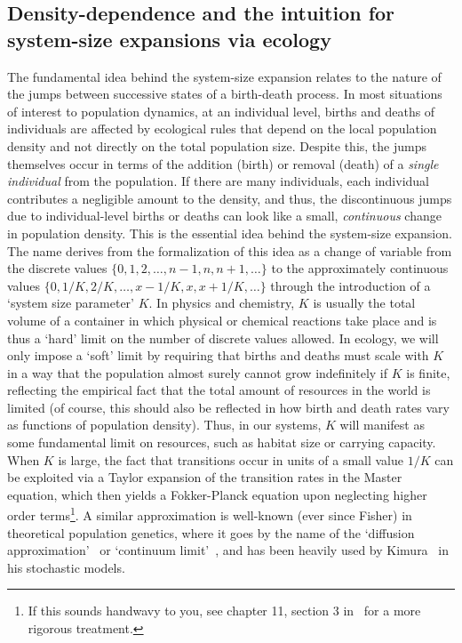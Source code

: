 \subsection{Density-dependence and the intuition for system-size expansions via ecology}\label{sec_intuition_sys_size}
The fundamental idea behind the system-size expansion relates to the nature of the jumps between successive states of a birth-death process. In most situations of interest to population dynamics, at an individual level, births and deaths of individuals are affected by ecological rules that depend on the local population density and not directly on the total population size. Despite this, the jumps themselves occur in terms of the addition (birth) or removal (death) of a \emph{single individual} from the population. If there are many individuals, each individual contributes a negligible amount to the density, and thus, the discontinuous jumps due to individual-level births or deaths can look like a small, \emph{continuous} change in population density. This is the essential idea behind the system-size expansion. The name derives from the formalization of this idea as a change of variable from the discrete values $\{0,1,2,\ldots,n-1,n,n+1,\ldots\}$ to the approximately continuous values $\{0,1/K,2/K,\dots,x-1/K,x,x+1/K,\ldots\}$ through the introduction of a `system size parameter' $K$. In physics and chemistry, $K$ is usually the total volume of a container in which physical or chemical reactions take place and is thus a `hard' limit on the number of discrete values allowed. In ecology, we will only impose a `soft' limit by requiring that births and deaths must scale with $K$ in a way that the population almost surely cannot grow indefinitely if $K$ is finite, reflecting the empirical fact that the total amount of resources in the world is limited (of course, this should also be reflected in how birth and death rates vary as functions of population density). Thus, in our systems, $K$ will manifest as some fundamental limit on resources, such as habitat size or carrying capacity. When $K$ is large, the fact that transitions occur in units of a small value $1/K$ can be exploited via a Taylor expansion of the transition rates in the Master equation, which then yields a Fokker-Planck equation upon neglecting higher order terms\footnote{If this sounds handwavy to you, see chapter 11, section 3 in~\citet{ethier_markov_1986} for a more rigorous treatment.}. A similar approximation is well-known (ever since Fisher) in theoretical population genetics, where it goes by the name of the `diffusion approximation'~\citep{ewens_mathematical_2004,barton_mathematical_2019} or `continuum limit'~\citep{czuppon_understanding_2021}, and has been heavily used by Kimura~\citep{crow_introduction_1970} in his stochastic models. 

